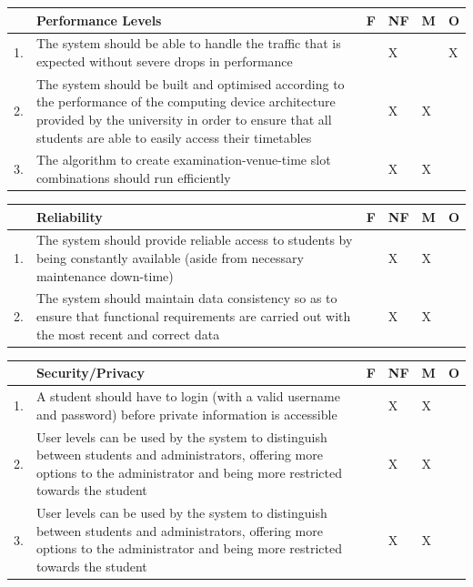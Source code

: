 \documentclass{article}
\begin{document}
\begin{center}
\begin{tabular}{|m{1cm}|m{10cm}|m{1cm}|m{1cm}|m{1cm}|m{1cm}|} 
\hline
 & \textbf{Performance Levels} & \textbf{F} & \textbf{NF} & \textbf{M} & \textbf{O} \\
\hline
1. & {The system should be able to handle the traffic that is expected without severe drops in performance} & & X & & X\\
\hline
2. & {The system should be built and optimised according to the performance of the computing device architecture provided by the university in order to ensure that all students are able to easily access their timetables} & & X & X & \\
\hline
3. & {The algorithm to create examination-venue-time slot combinations should run efficiently} & & X & X & \\
\hline
\end{tabular}
\end{center}

\begin{center}
\begin{tabular}{|m{1cm}|m{10cm}|m{1cm}|m{1cm}|m{1cm}|m{1cm}|} 
\hline
 & \textbf{Reliability} & \textbf{F} & \textbf{NF} & \textbf{M} & \textbf{O} \\
\hline
1. & {The system should provide reliable access to students by being constantly available (aside from necessary maintenance down-time)} & & X & X & \\
\hline
2. & {The system should maintain data consistency so as to ensure that functional requirements are carried out with the most recent and correct data} & & X & X & \\
\hline
\end{tabular}
\end{center}

\begin{center}
\begin{tabular}{|m{1cm}|m{10cm}|m{1cm}|m{1cm}|m{1cm}|m{1cm}|} 
\hline
 & \textbf{Security/Privacy} & \textbf{F} & \textbf{NF} & \textbf{M} & \textbf{O} \\
\hline
1. & {A student should have to login (with a valid username and password) before private information is accessible
} & & X & X & \\
\hline
2. & {User levels can be used by the system to distinguish between students and administrators, offering more options to the administrator and being more restricted towards the student} & & X & X & \\
\hline
3. & {User levels can be used by the system to distinguish between students and administrators, offering more options to the administrator and being more restricted towards the student} & & X & X & \\
\hline
\end{tabular}
\end{center}
\end{document}
